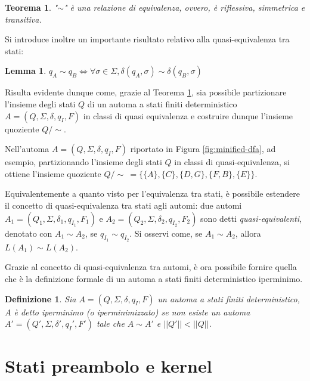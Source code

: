 \documentclass[a4paper,12pt]{report} %
\newcommand{\partitioned}[2]{#1\slash\!\!#2}  %
\newtheorem{theorem}{Teorema}[chapter]        %
\newtheorem{definition}{Definizione}[chapter] %
\newtheorem{lemma}{Lemma}[chapter]            %
\begin{document}
\begin{theorem}\label{th:aeq-rel-states}
  "$\sim$" è una relazione di equivalenza, ovvero, è riflessiva, simmetrica e transitiva.
\end{theorem}

Si introduce inoltre un importante risultato relativo alla quasi-equivalenza tra stati:

\begin{lemma}\label{lem:aeq-states}
  $q_A \sim q_B \Leftrightarrow \forall \sigma \in \Sigma, \delta(q_A, \sigma) \sim \delta(q_B, \sigma)$
\end{lemma}

Risulta evidente dunque come, grazie al Teorema \ref{th:aeq-rel-states}, sia possibile partizionare l'insieme 
degli stati $Q$ di un automa a stati finiti deterministico $A = (Q, \Sigma, \delta, q_I, F)$ in classi di quasi 
equivalenza e costruire dunque l'insieme quoziente $\partitioned{Q}{\sim}$.

Nell'automa $A = (Q, \Sigma, \delta, q_I, F)$ riportato in Figura \ref{fig:minified-dfa}, ad esempio, 
partizionando l'insieme degli stati $Q$ in classi di quasi-equivalenza, si ottiene l'insieme quoziente 
$\partitioned{Q}{\sim} \ = \{ \{ A \}, \{ C \}, \{ D, G \}, \{ F, B \}, \{ E \} \}$.

Equivalentemente a quanto visto per l'equivalenza tra stati, è possibile estendere il concetto di quasi-equivalenza
tra stati agli automi: due automi $A_1 = (Q_1, \Sigma, \delta_1,\allowbreak q_{I_1}, F_1)$ e 
$A_2 = (Q_2, \Sigma, \delta_2, q_{I_2}, F_2)$ sono detti \emph{quasi-equivalenti}, denotato con $A_1 \sim A_2$,
se $q_{I_1} \sim q_{I_2}$. Si osservi come, se $A_1 \sim A_2$, allora $L(A_1) \sim L(A_2)$.

Grazie al concetto di quasi-equivalenza tra automi, è ora possibile fornire quella che è la
definizione formale di un automa a stati finiti deterministico iperminimo.

\begin{definition}\label{def:hyper-min-dfa}
  Sia $A = (Q, \Sigma, \delta, q_I, F)$ un automa a stati finiti deterministico, $A$ è detto \emph{iperminimo}
  (o \emph{iperminimizzato}) se non esiste un automa $A' = (Q', \Sigma, \delta', q_I', F')$ tale che $A \sim A'$
  e $||Q'|| < ||Q||$.
\end{definition}

\section{Stati preambolo e kernel}
\label{sec:preamble-kernel}
\end{document}
